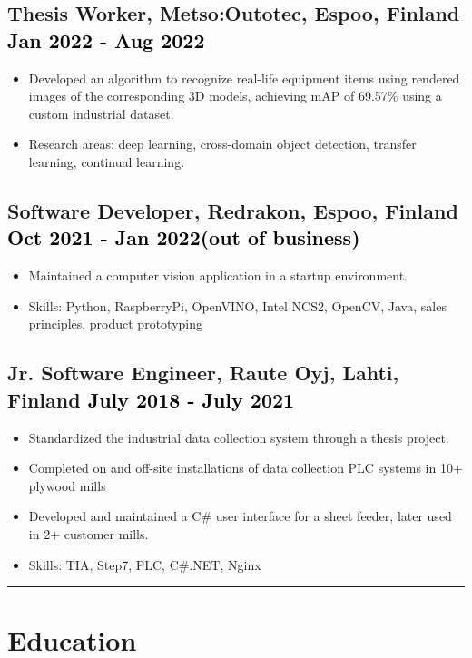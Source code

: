 \documentclass[a4paper,10pt]{article}
\begin{document}
\subsection*{Thesis Worker, Metso:Outotec, Espoo, Finland \hfill \textcolor{black}{Jan 2022 - Aug 2022}}
\begin{itemize}
    \item Developed an algorithm to recognize real-life equipment items using rendered images of the corresponding 3D models, achieving mAP of 69.57\% using a custom industrial dataset.
    \item Research areas: deep learning, cross-domain object detection, transfer learning, continual learning.
\end{itemize}

\subsection*{Software Developer, Redrakon, Espoo, Finland \hfill \textcolor{black}{Oct 2021 - Jan 2022(out of business)}}
\begin{itemize}
    \item Maintained a computer vision application in a startup environment.
    \item Skills: Python, RaspberryPi, OpenVINO, Intel NCS2, OpenCV, Java, sales principles, product prototyping 
\end{itemize}

\subsection*{Jr. Software Engineer, Raute Oyj, Lahti, Finland \hfill \textcolor{black}{July 2018 - July 2021}}
\begin{itemize}
    \item Standardized the industrial data collection system through a thesis project.
    \item Completed on and off-site installations of data collection PLC systems in 10+ plywood mills 
    \item Developed and maintained a C\# user interface for a sheet feeder, later used in 2+ customer mills.
    \item Skills: TIA, Step7, PLC, C\#.NET, Nginx
\end{itemize}

\vspace{0.2cm}
\hrule
\vspace{0.1cm}

\section*{Education}
\end{document}
